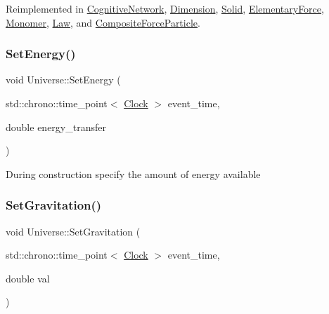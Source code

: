 Reimplemented in \mbox{\hyperlink{classCognitiveNetwork_a270f6842ec14b3e5b80dedf7b48ea6f4}{Cognitive\+Network}}, \mbox{\hyperlink{classDimension_aead73fc6a25388d14b514b2170735b1b}{Dimension}}, \mbox{\hyperlink{classSolid_a6617ae9fe4707d760a23b54eddf00dec}{Solid}}, \mbox{\hyperlink{classElementaryForce_af4f12038c33d7edf9f13339fcd632ec9}{Elementary\+Force}}, \mbox{\hyperlink{classMonomer_aa034728b74053ed3df452ddc8f1b46e8}{Monomer}}, \mbox{\hyperlink{classLaw_aca9bb82839ddb46bd89f52b6211c5a54}{Law}}, and \mbox{\hyperlink{classCompositeForceParticle_ad53c5d396b3c56241174a9bd78f9e07a}{Composite\+Force\+Particle}}.

\mbox{\label{classUniverse_a868250e67d0fcb2483aa8bdd73c40a02}} 
\subsubsection{\texorpdfstring{Set\+Energy()}{SetEnergy()}}
{\footnotesize\ttfamily void Universe\+::\+Set\+Energy (\begin{DoxyParamCaption}\item[{std\+::chrono\+::time\+\_\+point$<$ \mbox{\hyperlink{universe_8h_a0ef8d951d1ca5ab3cfaf7ab4c7a6fd80}{Clock}} $>$}]{event\+\_\+time,  }\item[{double}]{energy\+\_\+transfer }\end{DoxyParamCaption})}

During construction specify the amount of energy available\mbox{\label{classUniverse_ae0cb8d86b2fbb8396d605160344b42f5}} 
\subsubsection{\texorpdfstring{Set\+Gravitation()}{SetGravitation()}}
{\footnotesize\ttfamily void Universe\+::\+Set\+Gravitation (\begin{DoxyParamCaption}\item[{std\+::chrono\+::time\+\_\+point$<$ \mbox{\hyperlink{universe_8h_a0ef8d951d1ca5ab3cfaf7ab4c7a6fd80}{Clock}} $>$}]{event\+\_\+time,  }\item[{double}]{val }\end{DoxyParamCaption})\hspace{0.3cm}{\ttfamily [virtual]}}



